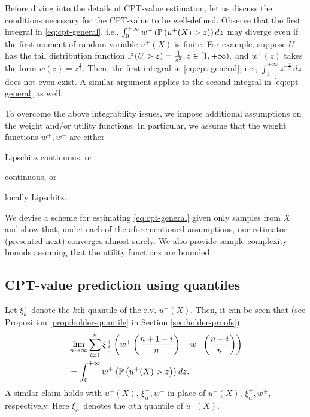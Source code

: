 
Before diving into the details of CPT-value estimation, let us discuss the conditions necessary for the CPT-value to be well-defined.
Observe that the first integral in \eqref{eq:cpt-general}, i.e., 
$\int_0^{+\infty} w^+\left(\mathbb{P}\left( u^+(X)>z \right)\right) d z$
may diverge even if the first moment of random variable $u^+(X)$ is finite. 
For example, suppose $U$ has the tail distribution function
$\mathbb{P}\left( U>z \right)  = \frac{1}{z^2}, z\in [1, +\infty),$
 and $w^+(z)$ takes the form $w(z) = z^{\frac{1}{3}}$. Then, the first integral in \eqref{eq:cpt-general}, i.e.,
$
\int_1^{+\infty}  z^{-\frac{2}{3}}\, dz
$
does not even exist. A similar argument applies to the second integral in \eqref{eq:cpt-general} as well.

To overcome the above integrability issues, we impose additional  assumptions on the weight and/or utility functions. In particular, we assume that the weight functions $w^+, w^-$ are either 
\begin{inparaenum}[\it (i)]
\item Lipschitz continuous, or
\item \holder continuous, or
\item locally Lipschitz.
\end{inparaenum}
We devise a scheme for estimating \eqref{eq:cpt-general} given only samples from $X$ and show that, under each of the aforementioned assumptions, our estimator (presented next) converges almost surely. 
We also provide sample complexity bounds assuming that the utility functions are bounded.

\subsection{CPT-value prediction using quantiles}
Let $\xi^+_{k}$ denote the $k$th quantile of the r.v. $u^+(X)$. 
Then, it can be seen that (see Proposition \ref{prop:holder-quantile} in Section \ref{sec:holder-proofs})
\begin{align}
&\lim_{n \rightarrow \infty} \sum_{i=1}^{n} \xi^+_{\frac{i}{n}} \left(w^+\left(\frac{n+1-i}{n}\right)- w^+\left(\frac{n-i}{n}\right) \right) \nonumber\\
&= \int_0^{+\infty} w^+\left(\mathbb{P}\left( u^+(X)>z \right)\right) dz.\label{eq:holder-quant-motiv}
\end{align}
A similar claim holds with $u^-(X)$, $\xi^-_{\alpha}, w^-$ in place of  $u^+(X)$, $\xi^+_{\alpha}, w^+$, respectively. Here $\xi^-_{\alpha}$ denotes the 
$\alpha$th quantile of $u^-(X)$.

